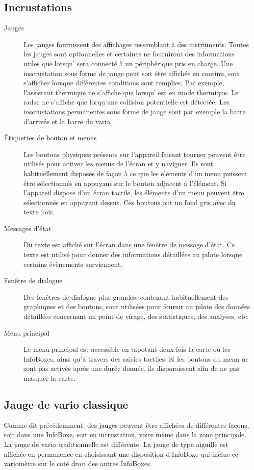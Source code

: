 \subsection*{Incrustations}
\begin{description}
\item[Jauges] Les jauges fournissent des affichages ressemblant à des instruments. Toutes les jauges sont optionnelles
et certaines ne fourniront des informations utiles que lorsqu'\xc{} sera
connecté à un périphérique pris en charge.
Une inscrustation sous forme de jauge peut soit être affichée en continu, soit s'afficher
lorsque différentes conditions sont remplies. Par exemple, l'assistant thermique ne s'affiche que lorsqu'\xc{} est en mode
thermique. Le radar \fl{} ne s'affiche que lorqu'une collision potentielle est détectée.
Les inscrustations permanentes sous forme de jauge sont par exemple la barre d'arrivée et
la barre du vario.
\item[Étiquettes de bouton et menus] Les boutons physiques présents sur l'appareil faisant tourner \xc{}
peuvent être utilisés pour activer les menus de l'écran et y naviguer. Ils sont
habituellement disposés de façon à ce que les éléments d'un menu puissent être sélectionnés en appuyant
sur le bouton adjacent à l'élément. Si l'appareil dispose d'un écran tactile, les éléments d'un menu
peuvent être sélectionnés en appuyant dessus. Ces boutons ont un fond gris avec du texte noir.
\item[Messages d'état] Du texte est affiché sur l'écran dans une fenêtre de message
d'état. Ce texte est utilisé pour donner des informations détaillées au pilote lorsque
certains évènements surviennent.
\item[Fenêtre de dialogue] Des fenêtres de dialogue plus grandes, contenant habituellement des graphiques et
des boutons, sont utilisées pour fournir au pilote des données détaillées concernant un point
de virage, des statistiques, des analyses, etc.
\item[Menu principal] Le menu principal est accessible en tapotant deux fois la carte ou
les InfoBoxes, ainsi qu'à travers des saisies tactiles. Si les boutons du menu ne sont pas activés après 
 une durée donnée, ils disparaissent afin de ne pas masquer
la carte.
\end{description}



\subsection*{Jauge de vario classique}
Comme dit précédemment, des jauges peuvent être affichées de différentes façons, soit dans une
InfoBoxe, soit en incrustation, voire même dans la zone principale. La jauge de vario traditionnelle est
différente. La jauge de type aiguille est affichée en permanence en choisissant une disposition
d'InfoBoxe qui inclue ce variomètre sur le coté droit des autres InfoBoxes.

